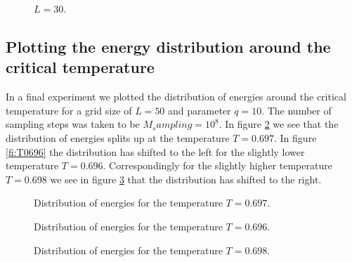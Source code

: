\begin{figure}
\centering
\begin{minipage}{0.7\textwidth}
\centering
\graphicspath{{../../Plots/}}

\caption{$L=30$.}
\label{fi:energies_T_q_L50}
\end{minipage}
\end{figure}


\subsection{Plotting the energy distribution around the critical temperature}

In a final experiment we plotted the distribution of energies around the critical temperature for a grid size of $L=50$ and parameter $q=10$. The number of sampling steps was taken to be $M_sampling=10^8$. In figure \ref{fi:T0697} we see that the distribution of energies splits up at the temperature $T=0.697$. In figure \ref{fi:T0696} the distribution has shifted to the left for the slightly lower temperature $T=0.696$. 
Correspondingly for the slightly higher temperature $T=0.698$ we see in figure \ref{fi:T0698} that the distribution has shifted to the right.

\begin{figure}
\centering
\begin{minipage}{0.7\textwidth}
\centering
\graphicspath{{../../Plots/}}

\caption{Distribution of energies for the temperature $T=0.697$.}
\label{fi:T0697}
\end{minipage}
\end{figure}

\begin{figure}
\centering
\begin{minipage}[b]{0.45\textwidth}
\centering
\graphicspath{{../../Plots/}}

\caption{Distribution of energies for the temperature  $T=0.696$.}
\label{fi:T0696}
\end{minipage}
\hfill
\begin{minipage}[b]{0.45\textwidth}
\centering
\graphicspath{{../../Plots/}}

\caption{Distribution of energies for the temperature  $T=0.698$.}
\label{fi:T0698}
\end{minipage}
\end{figure}



